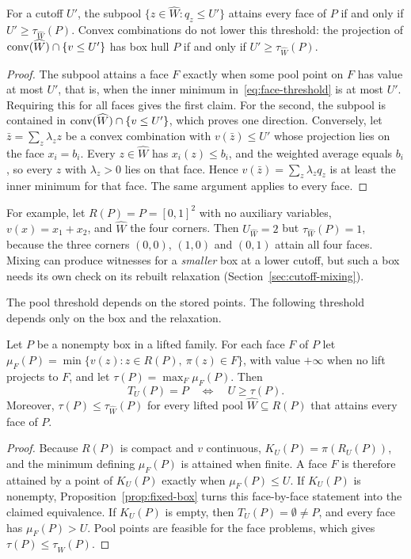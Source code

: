 \begin{proposition}\label{prop:face-threshold}
For a cutoff $U'$, the subpool $\{z\in\widehat W:q_z\le U'\}$ attains every
face of $P$ if and only if $U'\ge\tau_{\widehat W}(P)$. Convex
combinations do not lower this threshold: the projection of
$\operatorname{conv}(\widehat W)\cap\{v\le U'\}$ has box hull $P$ if and only if
$U'\ge\tau_{\widehat W}(P)$.
\end{proposition}
\begin{proof}
The subpool attains a face $F$ exactly when some pool point on $F$ has
value at most $U'$, that is, when the inner minimum
in~\eqref{eq:face-threshold} is at most $U'$. Requiring this for all
faces gives the first claim. For the second, the subpool is contained in
$\operatorname{conv}(\widehat W)\cap\{v\le U'\}$, which proves one direction.
Conversely, let $\bar z=\sum_z\lambda_zz$ be a convex combination with
$v(\bar z)\le U'$ whose projection lies on the face $x_i=b_i$. Every
$z\in\widehat W$ has $x_i(z)\le b_i$, and the weighted average equals
$b_i$, so every $z$ with $\lambda_z>0$ lies on that face. Hence
$v(\bar z)=\sum_z\lambda_zq_z$ is at least the inner minimum for that
face. The same argument applies to every face.
\end{proof}

For example, let $R(P)=P=[0,1]^2$ with no auxiliary variables,
$v(x)=x_1+x_2$, and $\widehat W$ the four corners. Then
$U_{\widehat W}=2$ but $\tau_{\widehat W}(P)=1$, because the three
corners $(0,0)$, $(1,0)$ and $(0,1)$ attain all four faces. Mixing can
produce witnesses for a \emph{smaller} box at a lower cutoff, but such a
box needs its own check on its rebuilt relaxation
(Section~\ref{sec:cutoff-mixing}).

The pool threshold depends on the stored points. The following threshold
depends only on the box and the relaxation.

\begin{proposition}\label{prop:box-threshold}
Let $P$ be a nonempty box in a lifted family. For each face $F$ of $P$ let
$\mu_F(P)=\min\{v(z):z\in R(P),\ \pi(z)\in F\}$, with value $+\infty$
when no lift projects to $F$, and let $\tau(P)=\max_F\mu_F(P)$. Then
\[
 T_U(P)=P\quad\Longleftrightarrow\quad U\ge\tau(P).
\]
Moreover, $\tau(P)\le\tau_{\widehat W}(P)$ for every lifted pool
$\widehat W\subseteq R(P)$ that attains every face of $P$.
\end{proposition}
\begin{proof}
Because $R(P)$ is compact and $v$ continuous, $K_U(P)=\pi(R_U(P))$, and
the minimum defining $\mu_F(P)$ is attained when finite. A face $F$ is
therefore attained by a point of $K_U(P)$ exactly when
$\mu_F(P)\le U$. If $K_U(P)$ is nonempty, Proposition~\ref{prop:fixed-box}
turns this face-by-face statement into the claimed equivalence. If
$K_U(P)$ is empty, then $T_U(P)=\emptyset\ne P$, and every face has
$\mu_F(P)>U$. Pool points are feasible for the face problems, which gives
$\tau(P)\le\tau_{\widehat W}(P)$.
\end{proof}

